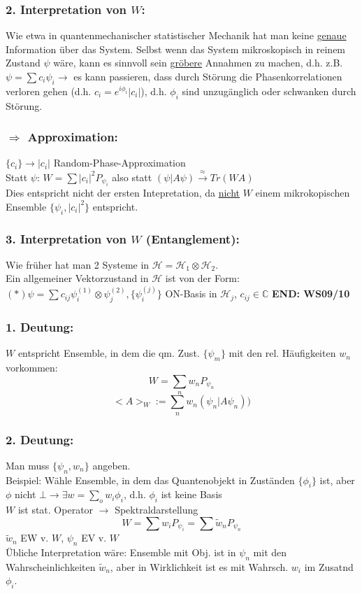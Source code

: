 \documentclass[twoside,a4paper]{scrartcl}
\newcommand{\C}{\mathbb{C}}
\renewcommand{\1}{\mathds{1}}
\newcommand{\Ra}{\Rightarrow}
\newcommand{\ra}{\rightarrow}
\renewcommand{\H}{\mathcal{H}}
\renewcommand{\C}{\mathbb{C}}
\begin{document}
\subsubsection*{2. Interpretation von $W$:}
Wie etwa in quantenmechanischer statistischer Mechanik hat man keine \underline{genaue} Information über das System. Selbst wenn das System mikroskopisch in reinem Zustand $\psi$ wäre, kann es sinnvoll sein \underline{gröbere} Annahmen zu machen, d.h. z.B. $\psi=\sum c_i \psi_i \ra$ es kann passieren, dass durch Störung die Phasenkorrelationen verloren gehen (d.h. $c_i=e^{i\phi_i}|c_i|$), d.h. $\phi_i$ sind unzugänglich oder schwanken durch Störung.
\subsubsection*{$\Ra$ Approximation:}
$\{c_i \} \ra |c_i|$ Random-Phase-Approximation\\
Statt $\psi$: $W=\sum |c_i|^2 P_{\psi_i}$ also statt $(\psi|A\psi) \stackrel{\approx}{\ra} Tr(WA)$\\
Dies entspricht nicht der ersten Intepretation, da \underline{nicht} $W$ einem mikrokopischen Ensemble $\{\psi_i, |c_i|^2\}$ entspricht.\\
\subsubsection*{3. Interpretation von $W$ (Entanglement):}
Wie früher hat man 2 Systeme in $\H=\H_1\otimes \H_2$.\\
Ein allgemeiner Vektorzustand in $\H$ ist von der Form: $(*) \psi=\sum c_{ij} \psi_i^{(1)} \otimes \psi_j^{(2)}, \{\psi_i^{(j)}\}$ ON-Basis in $\H_j$, $c_{ij} \in \C$
\textbf{END: WS09/10}
\subsubsection*{1. Deutung:}
$W$ entspricht Ensemble, in dem die qm. Zust. $\{\psi_m\}$ mit den rel. Häufigkeiten $w_n$ vorkommen:
$$W=\sum_n w_n P_{\psi_n}$$
$$<A>_W:=\sum_n w_n (\psi_n|A\psi_n))$$

\subsubsection*{2. Deutung:}
Man muss $\{\psi_n,w_n\}$ angeben.\\
 Beispiel: Wähle Ensemble, in dem das Quantenobjekt in Zuständen $\{\phi_i\}$ ist, aber $\phi$ nicht $\bot \ra \exists w=\sum_o w_i \phi_i$, d.h. $\phi_i$ ist keine Basis\\
$W$ ist stat. Operator $\ra$ Spektraldarstellung
$$W=\sum w_i P_{\psi_i}=\sum \tilde w_n P_{\psi_n}$$
$\tilde w_n$ EW v. $W$, $\psi_n$ EV v. $W$\\
Übliche Interpretation wäre: Ensemble mit Obj. ist in $\psi_n$ mit den Wahrscheinlichkeiten $\tilde w_n$, aber in Wirklichkeit ist es mit Wahrsch. $w_i$ im Zusatnd $\phi_i$.
\end{document}
